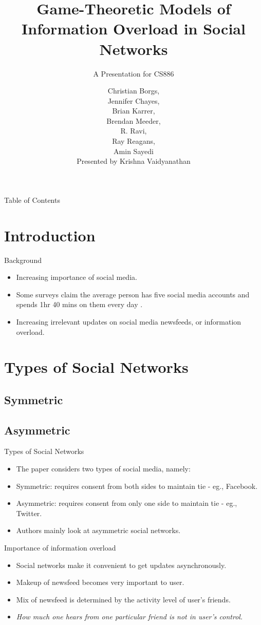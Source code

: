 \documentclass[aspectratio=169]{beamer}
\title[Game-Theoretic Models]{Game-Theoretic Models of Information Overload in Social Networks}
\subtitle{A Presentation for CS886}
\author[Presented by Krishna Vaidyanathan]{Christian Borgs,\\Jennifer
    Chayes,\\Brian Karrer,\\Brendan Meeder,\\R. Ravi,\\Ray Reagans,\\Amin
    Sayedi\\\vspace{1em}Presented by Krishna Vaidyanathan}
\newcommand{\bi}{\begin{itemize}}
\newcommand{\ei}{\end{itemize}}
\begin{document}
\frame[plain]{\titlepage}

\begin{frame}{Table of Contents}
\tableofcontents
\end{frame}

\section{Introduction}
\begin{frame}{Background}
    \bi
\item Increasing importance of social media.
    \pause
\item Some surveys claim the average person has five social media accounts and
    spends 1hr 40 mins on them every day \cite{telegraph15}.
    \pause
\item Increasing irrelevant updates on social media newsfeeds, or information overload.
    \ei
\end{frame}

\section{Types of Social Networks}
\subsection{Symmetric}
\subsection{Asymmetric}
\begin{frame}{Types of Social Networks}
    \bi
\item The paper considers two types of social media, namely:
    \pause
\item Symmetric: requires consent from both sides to maintain tie - eg.,
    Facebook.
    \pause
\item Asymmetric: requires consent from only one side to maintain tie - eg.,
    Twitter.
    \pause
\item Authors mainly look at asymmetric social networks.
    \ei
\end{frame}

\begin{frame}{Importance of information overload}
    \bi
\item Social networks make it convenient to get updates asynchronously.
    \pause
\item Makeup of newsfeed becomes very important to user.
    \pause
\item Mix of newsfeed is determined by the activity level of user's friends.
    \pause
\item \textit{How much one hears from one particular friend is not in user's 
        control.}
    \ei
\end{frame}
\end{document}
